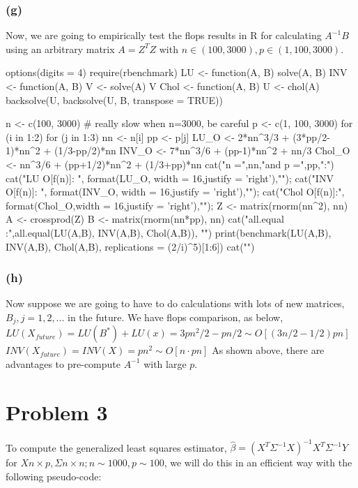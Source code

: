 \documentclass{article}
\begin{document}
\subsubsection*{(g)}
Now, we are going to empirically test the flops results in R for calculating $A^{-1}B$ using
an arbitrary matrix $A=Z^TZ$ with $n\in (100,3000), p\in (1,100,3000)$.

options(digits = 4)
require(rbenchmark)
LU <- function(A, B){ 
	solve(A, B)
}
INV <- function(A, B){ 
	V <- solve(A)
	V %
}
Chol <- function(A, B){ 
	U <- chol(A)
	backsolve(U, backsolve(U, B, transpose = TRUE))
}

n <- c(100, 3000) # really slow when n=3000, be careful
p <- c(1, 100, 3000)
for (i in 1:2){ 
	for (j in 1:3){
		nn <- n[i]
		pp <- p[j]
		LU_O   <- 2*nn^3/3 + (3*pp/2-1)*nn^2 + (1/3-pp/2)*nn
		INV_O  <- 7*nn^3/6 + (pp-1)*nn^2 + nn/3
		Chol_O <- nn^3/6 + (pp+1/2)*nn^2 + (1/3+pp)*nn
		cat("n =",nn,"and p =",pp,":\n")
		cat("LU O[f(n)]:  ", format(LU_O,  width = 16,justify = 'right'),"\n");
		cat("INV O[f(n)]: ", format(INV_O, width = 16,justify = 'right'),"\n");
		cat("Chol O[f(n)]:", format(Chol_O,width = 16,justify = 'right'),"\n"); 
		Z <- matrix(rnorm(nn^2), nn)
		A <- crossprod(Z) 
		B <- matrix(rnorm(nn*pp), nn) 
		cat("all.equal :",all.equal(LU(A,B), INV(A,B), Chol(A,B)), "\n")
		print(benchmark(LU(A,B), INV(A,B), Chol(A,B), replications = (2/i)^5)[1:6])
		cat("\n")
	}
}

\subsubsection*{(h)}
Now suppose we are going to have to do calculations with lots of new matrices, $B_j, j=1,2,...$
in the future. We have flops comparison, as below,
\newline
$LU(X_{future}) = LU(B^*) + LU(x) = 3pn^2/2 -pn/2 \sim O[(3n/2-1/2)pn]$
\newline
$INV(X_{future}) = INV(X) = pn^2 \sim O[n\cdot pn]$
\newline
As shown above, there are advantages to pre-compute $A^{-1}$ with large $p$.


\newpage
\section*{Problem 3}
To compute the generalized least squares estimator, 
$\hat\beta = (X^T\Sigma^{-1}X)^{-1}X^T\Sigma^{-1}Y$
for $X n\times p, \Sigma n\times n; n\sim 1000, p\sim 100$, we will
do this in an efficient way with the following pseudo-code:
\end{document}

